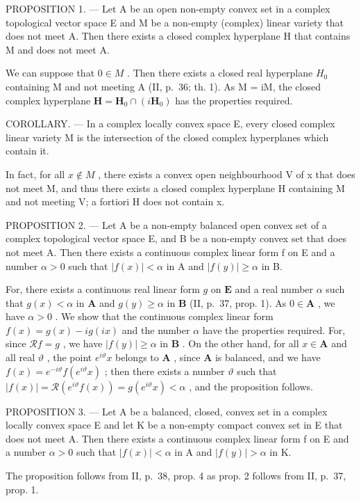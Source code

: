 PROPOSITION 1. --- Let A be an open non-empty convex set in a complex topological vector space E and M be a non-empty (complex) linear variety that does not meet A. Then there exists a closed complex hyperplane H that contains M and does not meet A.

We can suppose that \(0 \in M\) . Then there exists a closed real hyperplane \(H_{0}\) containing M and not meeting A (II, p.~36; th. 1). As M = iM, the closed complex hyperplane \(\mathbf{H} = \mathbf{H}_{0} \cap (i\mathbf{H}_{0})\) has the properties required.

COROLLARY. --- In a complex locally convex space E, every closed complex linear variety M is the intersection of the closed complex hyperplanes which contain it.

In fact, for all \(x \notin M\) , there exists a convex open neighbourhood V of x that does not meet M, and thus there exists a closed complex hyperplane H containing M and not meeting V; a fortiori H does not contain x.

PROPOSITION 2. --- Let A be a non-empty balanced open convex set of a complex topological vector space E, and B be a non-empty convex set that does not meet A. Then there exists a continuous complex linear form f on E and a number \(\alpha > 0\) such that \(|f(x)| < \alpha\) in A and \(|f(y)| \geqslant \alpha\) in B.

For, there exists a continuous real linear form \(g\) on \(\mathbf{E}\) and a real number \(\alpha\) such that \(g(x) < \alpha\) in \(\mathbf{A}\) and \(g(y) \geqslant \alpha\) in \(\mathbf{B}\) (II, p.~37, prop. 1). As \(0 \in \mathbf{A}\) , we have \(\alpha > 0\) . We show that the continuous complex linear form \(f(x) = g(x) - ig(ix)\) and the number \(\alpha\) have the properties required. For, since \(\mathcal{R}f = g\) , we have \(|f(y)| \geqslant \alpha\) in \(\mathbf{B}\) . On the other hand, for all \(x \in \mathbf{A}\) and all real \(\vartheta\) , the point \(e^{i\vartheta}x\) belongs to \(\mathbf{A}\) , since \(\mathbf{A}\) is balanced, and we have \(f(x) = e^{-i\vartheta}f(e^{i\vartheta}x)\) ; then there exists a number \(\vartheta\) such that \(|f(x)| = \mathcal{R}(e^{i\vartheta}f(x)) = g(e^{i\vartheta}x) < \alpha\) , and the proposition follows.

PROPOSITION 3. --- Let A be a balanced, closed, convex set in a complex locally convex space E and let K be a non-empty compact convex set in E that does not meet A. Then there exists a continuous complex linear form f on E and a number \(\alpha > 0\) such that \(|f(x)| < \alpha\) in A and \(|f(y)| > \alpha\) in K.

The proposition follows from II, p.~38, prop. 4 as prop. 2 follows from II, p.~37, prop. 1.

